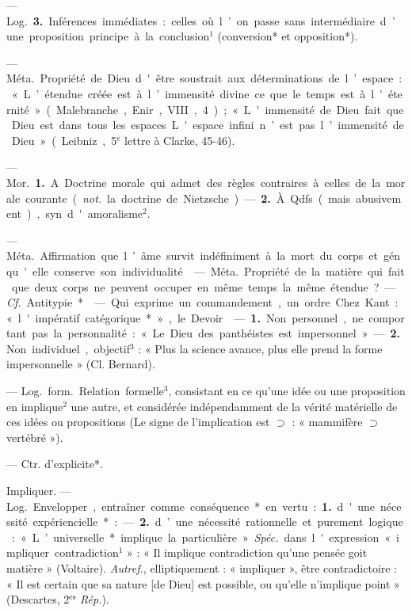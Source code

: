 \begin{itemize}[leftmargin=1cm, label=, itemsep=1pt]
— \si{Log.} {\bf 3.} Inférences immédiates :
celles où l’on passe sans intermédiaire d’une proposition principe à
la conclusion$^1$ (conversion* et opposition*).

 — \si{Méta.} Propriété de
Dieu d'être soustrait aux déterminations de l’espace : « L’étendue
créée est à l’immensité divine ce
que le temps est à l'éternité » (Malebranche, Enir., VIII, 4) ; « L'immensité de Dieu fait que Dieu est
dans tous les espaces. L'espace
infini n’est pas l’immensité de Dieu »
(Leibniz, 5$^\text{e}$ lettre à Clarke, 45-46).

 — \si{Mor.} {\bf 1.} A. Doctrine
morale qui admet des règles contraires à celles de la morale courante ({\it not.} la doctrine de Nietzsche).
— {\bf 2.} À Qdfs. (mais abusivement),
syn. d'amoralisme$^2$.

 — \si{Méta.} Affirmation que l’âme survit indéfiniment à la mort du corps et gén.
qu'elle conserve son individualité.

 — \si{Méta.} Propriété
de la matière qui fait que deux corps
ne peuvent occuper en même temps
la même étendue?. — {\it {\it Cf.}} Antitypie*.

 — Qui exprime un commandement, un ordre. Chez Kant :
« l'impératif catégorique* .», le
Devoir.

 — {\bf 1.} Non personnel,
ne comportant pas la personnalité :
« Le Dieu des panthéistes est impersonnel ». — {\bf 2.} Non individuel,
objectif$^3$ : « Plus la science avance,
plus elle prend la forme impersonnelle » (Cl. Bernard).

 — \si{Log.} \si{form.} Relation
formelle$^3$, consistant en ce qu’une
idée ou une proposition en implique$^2$
une autre, et considérée indépendamment de la vérité matérielle de
ces idées ou propositions (Le signe de
l’implication est $\supset$ : « mammifère $\supset$
vertébré »).

 — Ctr. d'explicite*.

Impliquer. — \si{Log.} Envelopper, entraîner comme conséquence* en
vertu : {\bf 1.} d'une nécessité expériencielle*: — {\bf 2.} d’une nécessité rationnelle et purement logique : « L’universelle* implique la particulière ».
{\it Spéc.} dans l'expression « impliquer
contradiction$^1$ » : « Il implique contradiction qu’une pensée goit matière » (Voltaire). {\it Autref.}, elliptiquement : « impliquer », être contradictoire : « Il est certain que sa
nature [de Dieu] est possible, ou
qu'elle n'implique point » (Descartes, 2$^\text{es}$ {\it Rép.}).


\end{itemize}
